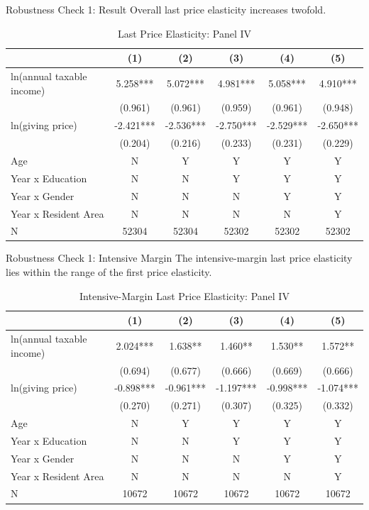 \documentclass[
  ignorenonframetext,
]{beamer}
\begin{document}
\begin{frame}{Robustness Check 1: Result}
\protect\hypertarget{robustness-check-1-result}{}
Overall last price elasticity increases twofold.

\begin{table}

\caption{\label{tab:kableLastElasticity1Slide}Last Price Elasticity: Panel IV}
\centering
\fontsize{7}{9}\selectfont
\begin{tabular}[t]{lccccc}
\toprule
 & (1) & (2) & (3) & (4) & (5)\\
\midrule
ln(annual taxable income) & 5.258*** & 5.072*** & 4.981*** & 5.058*** & 4.910***\\
 & (0.961) & (0.961) & (0.959) & (0.961) & (0.948)\\
ln(giving price) & -2.421*** & -2.536*** & -2.750*** & -2.529*** & -2.650***\\
 & (0.204) & (0.216) & (0.233) & (0.231) & (0.229)\\
Age & N & Y & Y & Y & Y\\
Year x Education & N & N & Y & Y & Y\\
Year x Gender & N & N & N & Y & Y\\
Year x Resident Area & N & N & N & N & Y\\
N & 52304 & 52304 & 52302 & 52302 & 52302\\
\bottomrule
\end{tabular}
\end{table}
\end{frame}

\begin{frame}{Robustness Check 1: Intensive Margin}
\protect\hypertarget{robustness-check-1-intensive-margin}{}
The intensive-margin last price elasticity lies within the range of the first price elasticity.

\begin{table}

\caption{\label{tab:kableLastElasticity2Slide1}Intensive-Margin Last Price Elasticity: Panel IV}
\centering
\fontsize{7}{9}\selectfont
\begin{tabular}[t]{lccccc}
\toprule
 & (1) & (2) & (3) & (4) & (5)\\
\midrule
ln(annual taxable income) & 2.024*** & 1.638** & 1.460** & 1.530** & 1.572**\\
 & (0.694) & (0.677) & (0.666) & (0.669) & (0.666)\\
ln(giving price) & -0.898*** & -0.961*** & -1.197*** & -0.998*** & -1.074***\\
 & (0.270) & (0.271) & (0.307) & (0.325) & (0.332)\\
Age & N & Y & Y & Y & Y\\
Year x Education & N & N & Y & Y & Y\\
Year x Gender & N & N & N & Y & Y\\
Year x Resident Area & N & N & N & N & Y\\
N & 10672 & 10672 & 10672 & 10672 & 10672\\
\bottomrule
\end{tabular}
\end{table}
\end{frame}
\end{document}
